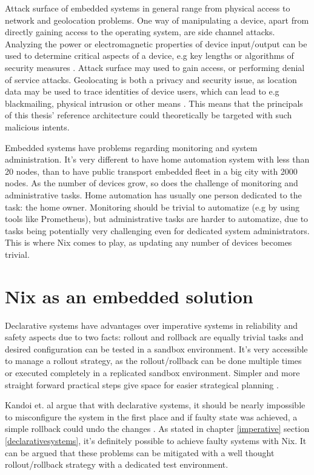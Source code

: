 Attack surface of embedded systems in general range from physical
access to network and geolocation problems. One way of manipulating a
device, apart from directly gaining access to the operating system,
are side channel attacks. Analyzing the power or electromagnetic
properties of device input/output can be used to determine critical
aspects of a device, e.g key lengths or algorithms of security
measures \cite{fysarakis2014embedded, serpanos2013security}. Attack
surface may used to gain access, or performing denial of service
attacks. Geolocating is both a privacy and security issue, as location
data may be used to trace identities of device users, which can lead
to e.g blackmailing, physical intrusion or other means
\cite{fysarakis2014embedded}. This means that the principals of this
thesis' reference architecture could theoretically be targeted with such malicious
intents.

Embedded systems have problems regarding monitoring and system
administration. It's very different to have home automation system
with less than 20 nodes, than to have public transport embedded fleet
in a big city with 2000 nodes. As the number of devices grow, so does
the challenge of monitoring and administrative tasks. Home automation
has usually one person dedicated to the task: the home owner. Monitoring should be trivial to automatize (e.g by using
tools like Prometheus), but administrative tasks are harder to
automatize, due to tasks being potentially very challenging even for
dedicated system administrators. This is where Nix comes to play, as
updating any number of devices becomes trivial.


\section{Nix as an embedded solution} \label{nixosassolution}

Declarative systems have advantages over imperative systems in
reliability and safety aspects due to two facts: rollout and rollback
are equally trivial tasks and desired configuration can be tested in a
sandbox environment. It's very accessible to manage a rollout strategy,
as the rollout/rollback can be done multiple times or executed
completely in a replicated sandbox environment. Simpler and more straight forward practical steps give space for
easier strategical planning \cite{kandoi2021operating}.

Kandoi et. al argue that with declarative systems, it should be nearly
impossible to misconfigure the system in the first place and if faulty
state was achieved, a simple rollback could undo the changes
\cite{kandoi2021operating}. As stated in chapter \ref{imperative}
section \ref{declarativesystems}, it's definitely possible to achieve
faulty systems with Nix. It can be argued that these problems can be mitigated
with a well thought rollout/rollback strategy with a dedicated test environment.

